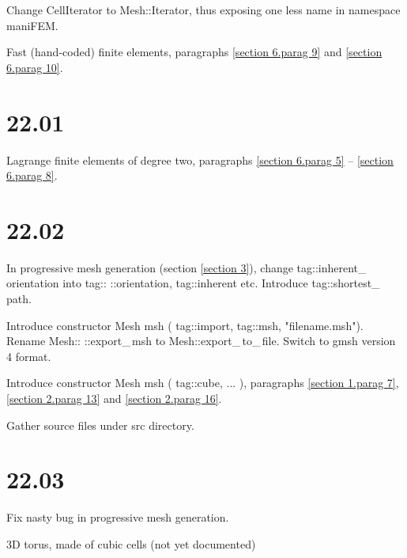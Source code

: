\documentclass[a4paper]{scrreprt}
\def\numb{}
\newcommand\azul[1]{\textcolor{nova}{#1}}
\newcommand\verm[1]{\textcolor{manif}{#1}}
\newcommand\verde[1]{\textcolor{string}{#1}}
\renewcommand\tt{\normalfont\ttfamily}
\begin{document}
\noindent Change {\small\tt\verm{CellIterator}} to {\small\tt\verm{Mesh}::Iterator},
thus exposing one less name in {\small\tt namespace \verm{maniFEM}}.

\noindent Fast (hand-coded) finite elements, paragraphs \ref{\numb section 6.\numb parag 9}
and \ref{\numb section 6.\numb parag 10}.


\section*{22.01}

\noindent Lagrange finite elements of degree two, paragraphs \ref{\numb section 6.\numb parag 5}
-- \ref{\numb section 6.\numb parag 8}.


\section*{22.02}

\noindent In progressive mesh generation (section \ref{\numb section 3}), change
{\small\tt\textcolor{tag}{tag}::inherent\_\,orientation} into
{\small\tt\textcolor{tag}{tag}::} {\small\tt::orientation,} {\small\tt\textcolor{tag}{tag}::inherent} etc.
Introduce {\small\tt\textcolor{tag}{tag}::shortest\_\,path}.

\noindent Introduce constructor {\small\tt\verm{Mesh}} {\small\tt \azul{msh}} {\small\tt (}
{\small\tt\textcolor{tag}{tag}::import,} {\small\tt \textcolor{tag}{tag}::msh,}
{\small\tt\verde{"filename.msh"})}.
\noindent Rename {\small\tt\verm{Mesh}::} {\small\tt::export\_\,msh} to
{\small\tt\verm{Mesh}::export\_\,to\_\,file}.
Switch to {\small\tt gmsh} version 4 format.          

\noindent Introduce constructor {\small\tt\verm{Mesh}} {\small\tt \azul{msh}} {\small\tt (}
{\small\tt\textcolor{tag}{tag}::cube,} {\small\tt ...} {\small\tt )}, paragraphs
\ref{\numb section 1.\numb parag 7}, \ref{\numb section 2.\numb parag 13} and
\ref{\numb section 2.\numb parag 16}.

\noindent Gather source files under {\small\tt src} directory.


\section*{22.03}

\noindent Fix nasty bug in progressive mesh generation.

\noindent 3D torus, made of cubic cells (not yet documented)
\end{document}
